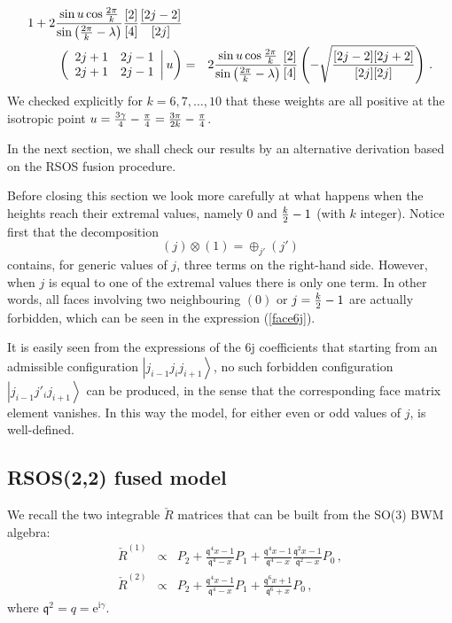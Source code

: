 \documentclass[11pt]{article}
\begin{document}
\begin{eqnarray}
    1+
    2\frac{\sin u \cos{2\pi \over k}}{\sin{\left({2\pi \over k}-\lambda\right)}} \frac{[2]}{[4]} \frac{[2j-2]}{[2j]}
             \nonumber \\
    \left. \left( \begin{array}{cc} 2 j +1 & 2 j -1 \\ 2 j + 1  & 2 j -1 \end{array} \right| u  \right) &=&  
    2\frac{\sin u \cos{2\pi \over k}}{\sin{\left({2\pi \over k}-\lambda\right)}} \frac{[2]}{[4]} \left(-\sqrt{\frac{[2j-2][2j+2]}{[2j][2j]}}\right) \,.
  \end{eqnarray}
%
We checked explicitly for $k=6,7,\ldots,10$ that these weights are all positive at the isotropic point $u = {3 \gamma  \over 4} - {\pi \over 4} = {3 \pi  \over 2 k} - {\pi \over 4} $.
 
In the next section, we shall check our results by an alternative derivation based on the RSOS fusion procedure.
 
Before closing this section we look more carefully at what happens when the heights reach their extremal values, namely $0$ and ${k \over 2}-1$ (with $k$ integer).
Notice first that the decomposition
%
\begin{equation}
 (j)\otimes (1) = \oplus_{j'}(j') 
\end{equation}
%
contains, for generic values of $j$, three terms on the right-hand side. However, when $j$ is equal to one of the extremal values there is only one term.
In other words, all faces involving two neighbouring $(0)$ or $j={k \over 2}-1$ are actually forbidden, which can be seen in the expression (\ref{face6j}).

It is easily seen from the expressions of the 6j coefficients that starting from an admissible configuration $\left| j_{i-1} j_i j_{i+1}\right\rangle$, no such forbidden configuration $\left| j_{i-1} j'_i j_{i+1}\right\rangle$ can be produced, in the sense that the corresponding face matrix element vanishes. 
In this way the model, for either even or odd values of $j$, is well-defined.


\subsection{RSOS(2,2) fused model}

We recall the two integrable $\check{R}$ matrices that can be built from the SO(3) BWM algebra:
%
\begin{eqnarray}
\check{R}^{(1)} & \propto & P_2  + \frac{\mathfrak{q}^4 x -1}{\mathfrak{q}^4 -x} P_1 +  \frac{\mathfrak{q}^4 x -1}{\mathfrak{q}^4 -x} \frac{\mathfrak{q}^2 x -1}{\mathfrak{q}^2 -x}P_0  \,, \\
\check{R}^{(2)} &\propto & P_2  + \frac{\mathfrak{q}^4 x -1}{\mathfrak{q}^4 -x} P_1 +  \frac{\mathfrak{q}^6 x +1}{\mathfrak{q}^6 +x}P_0 \,,
\end{eqnarray}
%
where $\mathfrak{q}^2 = q = \mathrm{e}^{\mathrm{i} \gamma}$.
\end{document}
